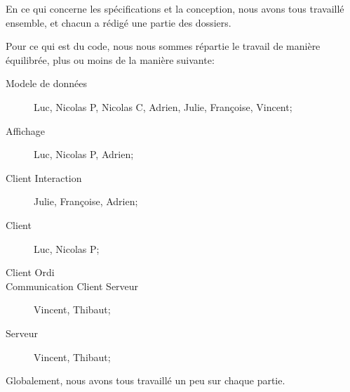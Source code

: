 

En ce qui concerne les spécifications et la conception, nous avons tous travaillé ensemble, et chacun a rédigé une partie des dossiers. 

Pour ce qui est du code, nous nous sommes répartie le travail de manière équilibrée, plus ou moins de la manière suivante:
\begin{description}
\item[Modele de données] Luc, Nicolas P, Nicolas C, Adrien, Julie, Françoise, Vincent;
\item[Affichage] Luc, Nicolas P, Adrien;
\item[Client Interaction] Julie, Françoise, Adrien;
\item[Client] Luc, Nicolas P;
\item[Client Ordi]
\item[Communication Client Serveur] Vincent, Thibaut;
\item[Serveur] Vincent, Thibaut;
\end{description}
Globalement, nous avons tous travaillé un peu sur chaque partie.